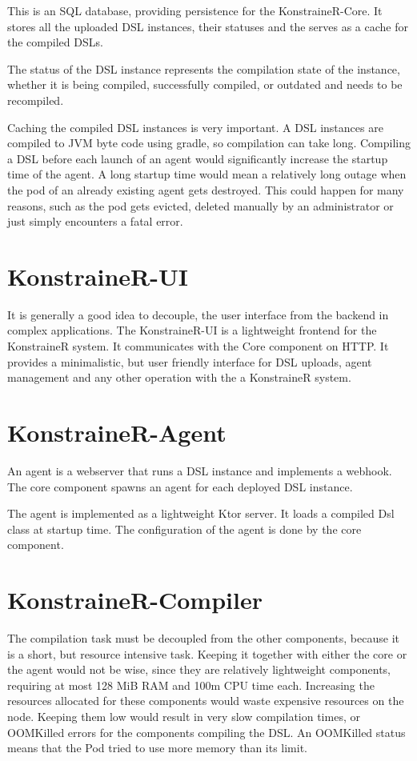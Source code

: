 This is an SQL database, providing persistence for the KonstraineR-Core. It stores all the uploaded DSL instances, their statuses and the serves as a cache for the compiled DSLs.

The status of the DSL instance represents the compilation state of the instance, whether it is being compiled, successfully compiled, or outdated and needs to be recompiled.

Caching the compiled DSL instances is very important. A DSL instances are compiled to JVM byte code using gradle, so compilation can take long. Compiling a DSL before each launch of an agent would significantly increase the startup time of the agent. A long startup time would mean a relatively long outage when the pod of an already existing agent gets destroyed. This could happen for many reasons, such as the pod gets evicted, deleted manually by an administrator or just simply encounters a fatal error.

\section{KonstraineR-UI}

It is generally a good idea to decouple, the user interface from the backend in complex applications. The KonstraineR-UI  is a lightweight frontend for the KonstraineR system. It communicates with the Core component on HTTP. It provides a minimalistic, but user friendly interface for DSL uploads, agent management and any other operation with the a KonstraineR system.

\section{KonstraineR-Agent}

An agent is a webserver that runs a DSL instance and implements a webhook. The core component spawns an agent for each deployed DSL instance.

The agent is implemented as a lightweight Ktor server. It loads a compiled Dsl class at startup time. The configuration of the agent is done by the core component.

\section{KonstraineR-Compiler}

The compilation task must be decoupled from the other components, because it is a short, but resource intensive task. Keeping it together with either the core or the agent would not be wise, since they are relatively lightweight components, requiring at most 128 MiB RAM and 100m CPU time each. Increasing the resources allocated for these components would waste expensive resources on the node. Keeping them low would result in very slow compilation times, or OOMKilled errors for the components compiling the DSL. An OOMKilled status means that the Pod tried to use more memory than its limit.

